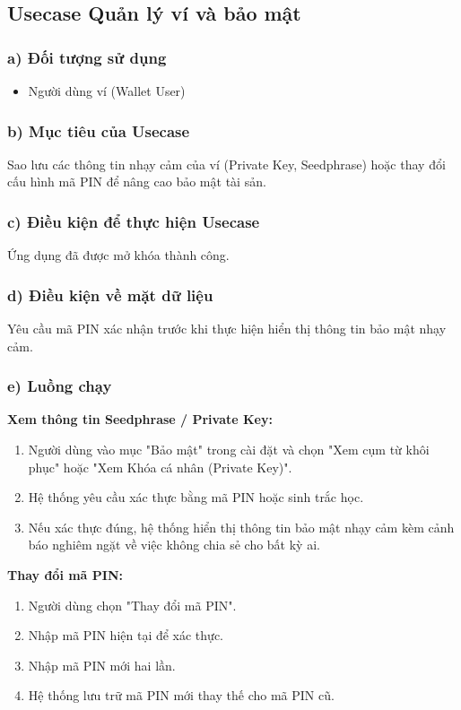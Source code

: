 \documentclass[a4paper]{report}
\begin{document}
\subsection{Usecase Quản lý ví và bảo mật}

\subsubsection{a) Đối tượng sử dụng}
\begin{itemize}
    \item Người dùng ví (Wallet User)
\end{itemize}

\subsubsection{b) Mục tiêu của Usecase}
Sao lưu các thông tin nhạy cảm của ví (Private Key, Seedphrase) hoặc thay đổi cấu hình mã PIN để nâng cao bảo mật tài sản.

\subsubsection{c) Điều kiện để thực hiện Usecase}
Ứng dụng đã được mở khóa thành công.

\subsubsection{d) Điều kiện về mặt dữ liệu}
Yêu cầu mã PIN xác nhận trước khi thực hiện hiển thị thông tin bảo mật nhạy cảm.

\subsubsection{e) Luồng chạy}
\textbf{Xem thông tin Seedphrase / Private Key:}
\begin{enumerate}
    \item Người dùng vào mục "Bảo mật" trong cài đặt và chọn "Xem cụm từ khôi phục" hoặc "Xem Khóa cá nhân (Private Key)".
    \item Hệ thống yêu cầu xác thực bằng mã PIN hoặc sinh trắc học.
    \item Nếu xác thực đúng, hệ thống hiển thị thông tin bảo mật nhạy cảm kèm cảnh báo nghiêm ngặt về việc không chia sẻ cho bất kỳ ai.
\end{enumerate}

\textbf{Thay đổi mã PIN:}
\begin{enumerate}
    \item Người dùng chọn "Thay đổi mã PIN".
    \item Nhập mã PIN hiện tại để xác thực.
    \item Nhập mã PIN mới hai lần.
    \item Hệ thống lưu trữ mã PIN mới thay thế cho mã PIN cũ.
\end{enumerate}
\end{document}

